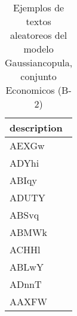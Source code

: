 \begin{table}[H]
\centering
\fontsize{8}{14}\selectfont
\caption{Ejemplos de textos aleatoreos del modelo Gaussiancopula, conjunto Economicos (B-2)}
\label{table-sample10-economicos-b-2-gaussiancopula-text}
\begin{tabular}{|m{50em}|}
\hline
\rowcolor[gray]{0.8}
description \\
\hline AEXGw \\
\hline ADYhi \\
\hline ABIqy \\
\hline ADUTY \\
\hline ABSvq \\
\hline ABMWk \\
\hline ACHHl \\
\hline ABLwY \\
\hline ADnnT \\
\hline AAXFW \\
\hline
\end{tabular}
\end{table}
